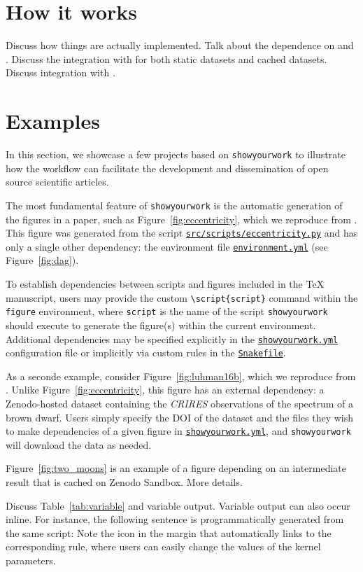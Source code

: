 \documentclass{aastex631}
\newcommand\xxx[1]{{\color{red}#1}}
\newcommand\syw{\texttt{showyourwork}\xspace}
\newcommand\repoargurl{https://github.com/showyourwork/showyourwork-paper}
\newcommand\fileurl[1]{\repoargurl/blob/\GitHubSHA/#1}
\newcommand\repoargfile[1]{\href{\fileurl{#1}}{\texttt{#1}\xspace}}
\newcommand\figenv{\texttt{figure}\xspace}
\newcommand\scriptcmd{\texttt{\textbackslash script\{{\color{lsthilite}script}\}}\xspace}
\newcommand\scriptarg{\texttt{\color{lsthilite}script}\xspace}
\begin{document}
\section{How it works}
\label{sec:how-it-works}
\xxx{Discuss how things are actually implemented. Talk about the dependence on \snakemake \citep{Molder2021} and \tectonic. Discuss the integration with \Zenodo for both static datasets and cached datasets. Discuss integration with \Overleaf.}

\section{Examples}
\label{sec:examples}
In this section, we showcase a few projects based on \syw to illustrate how the workflow can facilitate the development and dissemination of open source scientific articles.

The most fundamental feature of \syw is the automatic generation of the figures in a paper, such as Figure~\ref{fig:eccentricity}, which we reproduce from \citet{Wagg2022}.
This figure was generated from the script \repoargfile{src/scripts/eccentricity.py} and has only a single other dependency: the \conda environment file \repoargfile{environment.yml} (see Figure~\ref{fig:dag}).

To establish dependencies between scripts and figures included in the TeX manuscript, users may provide the custom \scriptcmd command within the \figenv environment, where \scriptarg is the name of the script \syw should execute to generate the figure(s) within the current environment.
Additional dependencies may be specified explicitly in the \repoargfile{showyourwork.yml} configuration file or implicitly via custom rules in the \repoargfile{Snakefile}.

As a seconde example, consider Figure~\ref{fig:luhman16b}, which we reproduce from \citet{Luger2021c}. 
Unlike Figure~\ref{fig:eccentricity}, this figure has an external dependency: a Zenodo-hosted dataset containing the \emph{CRIRES} observations of the spectrum of a brown dwarf.
Users simply specify the DOI of the dataset and the files they wish to make dependencies of a given figure in \repoargfile{showyourwork.yml}, and \syw will download the data as needed.

Figure~\ref{fig:two_moons} is an example of a figure depending on an intermediate result that is cached on Zenodo Sandbox.
\xxx{More details.}

\xxx{Discuss Table~\ref{tab:variable} and variable output.}
Variable output can also occur inline. For instance, the following sentence is programmatically generated from the same script: 
Note the icon in the margin that automatically links to the corresponding \snakemake rule, where users can easily change the values of the kernel parameters.
\end{document}
